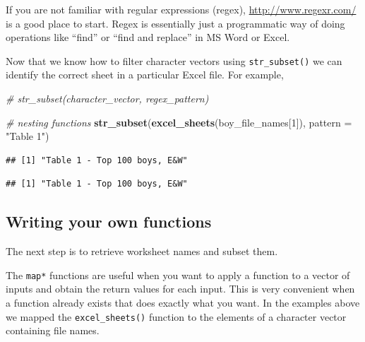 \documentclass[]{book}
\newenvironment{Shaded}{\begin{snugshade}}{\end{snugshade}}
\newcommand{\CommentTok}[1]{\textcolor[rgb]{0.56,0.35,0.01}{\textit{#1}}}
\newcommand{\DataTypeTok}[1]{\textcolor[rgb]{0.13,0.29,0.53}{#1}}
\newcommand{\DecValTok}[1]{\textcolor[rgb]{0.00,0.00,0.81}{#1}}
\newcommand{\KeywordTok}[1]{\textcolor[rgb]{0.13,0.29,0.53}{\textbf{#1}}}
\newcommand{\NormalTok}[1]{#1}
\newcommand{\OperatorTok}[1]{\textcolor[rgb]{0.81,0.36,0.00}{\textbf{#1}}}
\newcommand{\StringTok}[1]{\textcolor[rgb]{0.31,0.60,0.02}{#1}}
\begin{document}
If you are not familiar with regular expressions (regex),
\url{http://www.regexr.com/} is a good place to start. Regex is essentially
just a programmatic way of doing operations like ``find'' or ``find and replace''
in MS Word or Excel.

Now that we know how to filter character vectors using \texttt{str\_subset()} we can
identify the correct sheet in a particular Excel file. For example,

\begin{Shaded}
\begin{Highlighting}[]
\CommentTok{# str_subset(character_vector, regex_pattern)}

\CommentTok{# nesting functions}
\KeywordTok{str_subset}\NormalTok{(}\KeywordTok{excel_sheets}\NormalTok{(boy_file_names[}\DecValTok{1}\NormalTok{]), }\DataTypeTok{pattern =} \StringTok{"Table 1"}\NormalTok{)}
\end{Highlighting}
\end{Shaded}

\begin{verbatim}
## [1] "Table 1 - Top 100 boys, E&W"
\end{verbatim}

\begin{Shaded}
\end{Shaded}

\begin{verbatim}
## [1] "Table 1 - Top 100 boys, E&W"
\end{verbatim}

\hypertarget{writing-your-own-functions}{%
\subsection{Writing your own functions}\label{writing-your-own-functions}}

The next step is to retrieve worksheet names and subset them.

The \texttt{map*} functions are useful when you want to apply a function to a
vector of inputs and obtain the return values for each input. This
is very convenient when a function already exists that does exactly what you
want. In the examples above we mapped the \texttt{excel\_sheets()} function to
the elements of a character vector containing file names.
\end{document}
